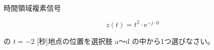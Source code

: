 時間領域複素信号 

\[
z(t) = t^2 \cdot \textrm{e}^{ -j \cdot 0 }
\]

\medskip
\noindent の $t = -2$ [秒]地点の位置を選択肢 a〜d の中から1つ選びなさい。
